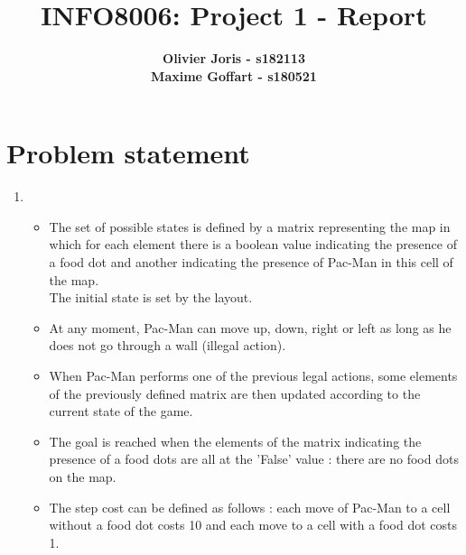 \documentclass{article}
\begin{document}

\title{\Large{INFO8006: Project 1 - Report}}
\vspace{1cm}
\author{\small{\bf Olivier Joris - s182113} \\ \small{\bf Maxime Goffart - s180521}}

\maketitle


\section{Problem statement}

\begin{enumerate}[label=\alph*.]
    \item 
       \begin{itemize}
            \item[\textbullet] The set of possible states is defined by a matrix representing the map in which for each element there is a boolean value
                               indicating the presence of a food dot and another indicating the presence of Pac-Man in this cell of the map.\\
                               The initial state is set by the layout.
            \item[\textbullet] At any moment, Pac-Man can move up, down, right or left as long as he does not go through a wall (illegal action).
            \item[\textbullet] When Pac-Man performs one of the previous legal actions, some elements of the previously defined matrix are then updated according to the current state of the game.
            \item[\textbullet] The goal is reached when the elements of the matrix indicating the presence of a food dots are all at the 'False' value : there are no food dots on the map.
            \item[\textbullet] The step cost can be defined as follows : each move of Pac-Man to a cell without a food dot costs 10 and each move to a cell with a food dot costs 1.
       \end{itemize}
\end{enumerate}
\end{document}
